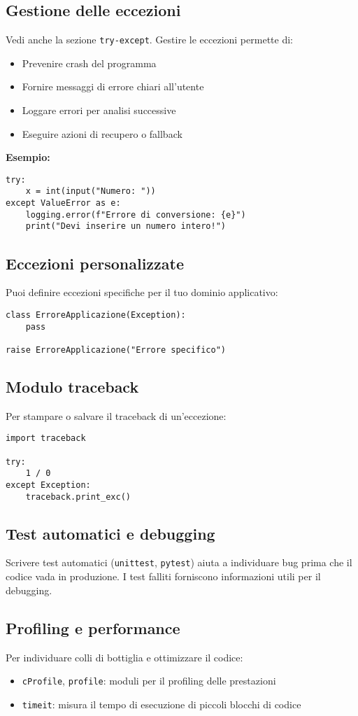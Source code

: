 \documentclass[a4paper,12pt]{article}
\begin{document}
\subsection*{Gestione delle eccezioni}
Vedi anche la sezione \texttt{try-except}. Gestire le eccezioni permette di:
\begin{itemize}
    \item Prevenire crash del programma
    \item Fornire messaggi di errore chiari all'utente
    \item Loggare errori per analisi successive
    \item Eseguire azioni di recupero o fallback
\end{itemize}
\textbf{Esempio:}
\begin{lstlisting}
try:
    x = int(input("Numero: "))
except ValueError as e:
    logging.error(f"Errore di conversione: {e}")
    print("Devi inserire un numero intero!")
\end{lstlisting}

\subsection*{Eccezioni personalizzate}
Puoi definire eccezioni specifiche per il tuo dominio applicativo:
\begin{lstlisting}
class ErroreApplicazione(Exception):
    pass

raise ErroreApplicazione("Errore specifico")
\end{lstlisting}

\subsection*{Modulo traceback}
Per stampare o salvare il traceback di un'eccezione:
\begin{lstlisting}
import traceback

try:
    1 / 0
except Exception:
    traceback.print_exc()
\end{lstlisting}

\subsection*{Test automatici e debugging}
Scrivere test automatici (\texttt{unittest}, \texttt{pytest}) aiuta a individuare bug prima che il codice vada in produzione. I test falliti forniscono informazioni utili per il debugging.

\subsection*{Profiling e performance}
Per individuare colli di bottiglia e ottimizzare il codice:
\begin{itemize}
    \item \texttt{cProfile}, \texttt{profile}: moduli per il profiling delle prestazioni
    \item \texttt{timeit}: misura il tempo di esecuzione di piccoli blocchi di codice
\end{itemize}
\end{document}
